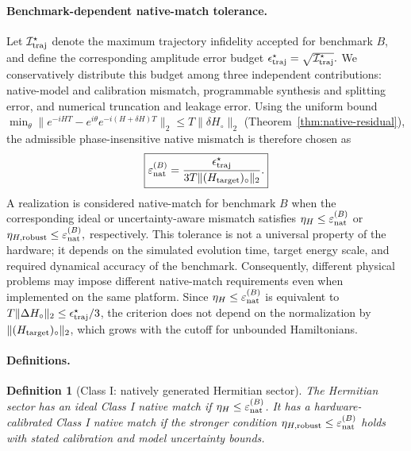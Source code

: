 \documentclass[pra,twocolumn,superscriptaddress,nofootinbib,floatfix]{revtex4-2}
\newtheorem{definition}{Definition}
\theoremstyle{remark}
\begin{document}
\paragraph{Benchmark-dependent native-match tolerance.}
Let \( \mathcal I_{\rm traj}^{\star} \) denote the maximum trajectory infidelity accepted for benchmark \(B\), and define the corresponding amplitude error budget \(\epsilon_{\rm traj}^{\star}=\sqrt{\mathcal I_{\rm traj}^{\star}}.\) We conservatively distribute this budget among three independent contributions: native-model and calibration mismatch, programmable synthesis and splitting error, and numerical truncation and leakage error. Using the uniform bound \(\min_\theta\|e^{-iH T}-e^{i\theta}e^{-i(H+\delta H)T}\|_2\le T\|\delta H_\circ\|_2\) (Theorem~\ref{thm:native-residual}), the admissible phase-insensitive native mismatch is therefore chosen as
\begin{align}
\boxed{
\varepsilon_{\rm nat}^{(B)}=\frac{\epsilon_{\rm traj}^{\star}}{3T\|(H_{\rm target})_\circ\|_2}.
}
\label{eq:calibration-tolerance}
\end{align}
A realization is considered native-match for benchmark \(B\) when the corresponding ideal or uncertainty-aware mismatch satisfies \(\eta_H\leq \varepsilon_{\rm nat}^{(B)}\) or \(\eta_{H,\rm robust}\leq \varepsilon_{\rm nat}^{(B)},\) respectively. This tolerance is not a universal property of the hardware; it depends on the simulated evolution time, target energy scale, and required dynamical accuracy of the benchmark. Consequently, different physical problems may impose different native-match requirements even when implemented on the same platform. Since \(\eta_H\le\varepsilon_{\rm nat}^{(B)}\) is equivalent to \(T\|\Delta H_\circ\|_2\le\epsilon_{\rm traj}^\star/3\), the criterion does not depend on the normalization by \(\|(H_{\rm target})_\circ\|_2\), which grows with the cutoff for unbounded Hamiltonians.

\paragraph{Definitions.}
\begin{definition}[Class I: natively generated Hermitian sector]
\label{def:class-I}
The Hermitian sector has an \emph{ideal Class I native match} if \(\eta_H\leq\varepsilon_{\rm nat}^{(B)}\). It has a \emph{hardware-calibrated Class I native match} if the stronger condition \(\eta_{H,{\rm robust}}\leq\varepsilon_{\rm nat}^{(B)}\) holds with stated calibration and model uncertainty bounds.
\end{definition}
\end{document}

